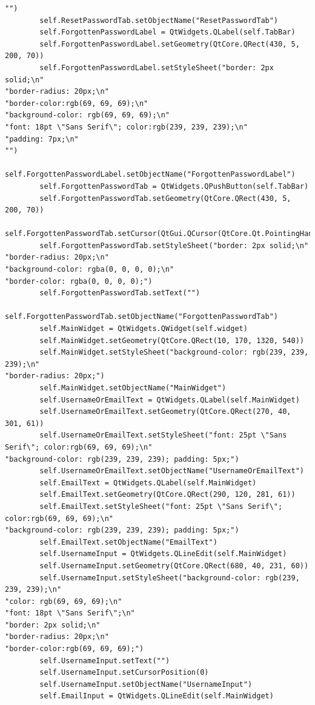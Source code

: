 \documentclass{article}
\begin{document}
\begin{lstlisting}
"")
        self.ResetPasswordTab.setObjectName("ResetPasswordTab")
        self.ForgottenPasswordLabel = QtWidgets.QLabel(self.TabBar)
        self.ForgottenPasswordLabel.setGeometry(QtCore.QRect(430, 5, 200, 70))
        self.ForgottenPasswordLabel.setStyleSheet("border: 2px solid;\n"
"border-radius: 20px;\n"
"border-color:rgb(69, 69, 69);\n"
"background-color: rgb(69, 69, 69);\n"
"font: 18pt \"Sans Serif\"; color:rgb(239, 239, 239);\n"
"padding: 7px;\n"
"")
        self.ForgottenPasswordLabel.setObjectName("ForgottenPasswordLabel")
        self.ForgottenPasswordTab = QtWidgets.QPushButton(self.TabBar)
        self.ForgottenPasswordTab.setGeometry(QtCore.QRect(430, 5, 200, 70))
        self.ForgottenPasswordTab.setCursor(QtGui.QCursor(QtCore.Qt.PointingHandCursor))
        self.ForgottenPasswordTab.setStyleSheet("border: 2px solid;\n"
"border-radius: 20px;\n"
"background-color: rgba(0, 0, 0, 0);\n"
"border-color: rgba(0, 0, 0, 0);")
        self.ForgottenPasswordTab.setText("")
        self.ForgottenPasswordTab.setObjectName("ForgottenPasswordTab")
        self.MainWidget = QtWidgets.QWidget(self.widget)
        self.MainWidget.setGeometry(QtCore.QRect(10, 170, 1320, 540))
        self.MainWidget.setStyleSheet("background-color: rgb(239, 239, 239);\n"
"border-radius: 20px;")
        self.MainWidget.setObjectName("MainWidget")
        self.UsernameOrEmailText = QtWidgets.QLabel(self.MainWidget)
        self.UsernameOrEmailText.setGeometry(QtCore.QRect(270, 40, 301, 61))
        self.UsernameOrEmailText.setStyleSheet("font: 25pt \"Sans Serif\"; color:rgb(69, 69, 69);\n"
"background-color: rgb(239, 239, 239); padding: 5px;")
        self.UsernameOrEmailText.setObjectName("UsernameOrEmailText")
        self.EmailText = QtWidgets.QLabel(self.MainWidget)
        self.EmailText.setGeometry(QtCore.QRect(290, 120, 281, 61))
        self.EmailText.setStyleSheet("font: 25pt \"Sans Serif\"; color:rgb(69, 69, 69);\n"
"background-color: rgb(239, 239, 239); padding: 5px;")
        self.EmailText.setObjectName("EmailText")
        self.UsernameInput = QtWidgets.QLineEdit(self.MainWidget)
        self.UsernameInput.setGeometry(QtCore.QRect(680, 40, 231, 60))
        self.UsernameInput.setStyleSheet("background-color: rgb(239, 239, 239);\n"
"color: rgb(69, 69, 69);\n"
"font: 18pt \"Sans Serif\";\n"
"border: 2px solid;\n"
"border-radius: 20px;\n"
"border-color:rgb(69, 69, 69);")
        self.UsernameInput.setText("")
        self.UsernameInput.setCursorPosition(0)
        self.UsernameInput.setObjectName("UsernameInput")
        self.EmailInput = QtWidgets.QLineEdit(self.MainWidget)

\end{lstlisting}
\end{document}
